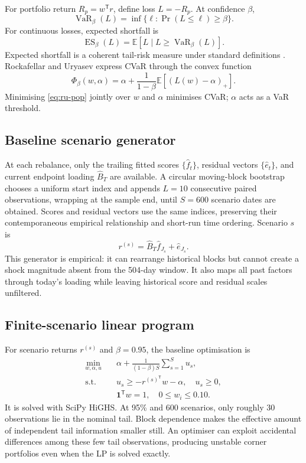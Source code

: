 \documentclass[11pt,a4paper]{article}
\newcommand{\E}{\mathbb{E}}
\newcommand{\VaR}{\operatorname{VaR}}
\newcommand{\ES}{\operatorname{ES}}
\newcommand{\one}{\bm{1}}
\newcommand{\wh}{\widehat}
\newcommand{\trans}{^{\mathsf T}}
\begin{document}
For portfolio return $R_p=w\trans r$, define loss $L=-R_p$. At confidence $\beta$,
\begin{equation}
 \VaR_\beta(L)=\inf\{\ell:\Pr(L\le\ell)\ge\beta\}.
\end{equation}
For continuous losses, expected shortfall is
\begin{equation}
 \ES_\beta(L)=\E[L\mid L\ge\VaR_\beta(L)].
\end{equation}
Expected shortfall is a coherent tail-risk measure under standard definitions \cite{acerbitasche2002}. Rockafellar and Uryasev express CVaR through the convex function \cite{rockafellar2000,rockafellar2002}
\begin{equation}
 \Phi_\beta(w,\alpha)=\alpha+\frac{1}{1-\beta}\E[(L(w)-\alpha)_+].
 \label{eq:ru-pop}
\end{equation}
Minimising \eqref{eq:ru-pop} jointly over $w$ and $\alpha$ minimises CVaR; $\alpha$ acts as a VaR threshold.

\subsection{Baseline scenario generator}

At each rebalance, only the trailing fitted scores $\{\wh f_t\}$, residual vectors $\{\wh e_t\}$, and current endpoint loading $\wh B_T$ are available. A circular moving-block bootstrap chooses a uniform start index and appends $L=10$ consecutive paired observations, wrapping at the sample end, until $S=600$ scenario dates are obtained. Scores and residual vectors use the same indices, preserving their contemporaneous empirical relationship and short-run time ordering. Scenario $s$ is
\begin{equation}
 r^{(s)}=\wh B_T\wh f_{J_s}+\wh e_{J_s}.
 \label{eq:baseline-scenario}
\end{equation}
This generator is empirical: it can rearrange historical blocks but cannot create a shock magnitude absent from the 504-day window. It also maps all past factors through today's loading while leaving historical score and residual scales unfiltered.

\subsection{Finite-scenario linear program}

For scenario returns $r^{(s)}$ and $\beta=0.95$, the baseline optimisation is
\begin{align}
 \min_{w,\alpha,u}\quad &\alpha+\frac{1}{(1-\beta)S}\sum_{s=1}^S u_s,\label{eq:cvar-lp}\\
 \text{s.t.}\quad
 &u_s\ge-r^{(s)\trans}w-\alpha,\quad u_s\ge0,\\
 &\one\trans w=1,\quad 0\le w_i\le0.10.
\end{align}
It is solved with SciPy HiGHS. At 95\% and 600 scenarios, only roughly 30 observations lie in the nominal tail. Block dependence makes the effective amount of independent tail information smaller still. An optimiser can exploit accidental differences among these few tail observations, producing unstable corner portfolios even when the LP is solved exactly.
\end{document}
